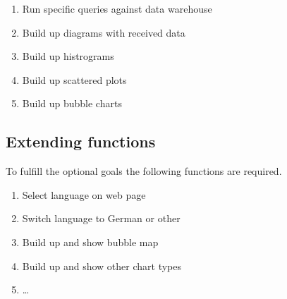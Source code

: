 \begin{enumerate}[resume]
  
  \item Run specific queries against data warehouse
  
  \item Build up diagrams with received data %
  
  \item Build up histrograms
  
  \item Build up scattered plots
  
  \item Build up bubble charts

\end{enumerate}


\subsection{Extending functions}

To fulfill the optional goals the following functions are required.

\begin{enumerate}[resume]
  
  \item Select language on web page
  
  \item Switch language to German or other
  
  \item Build up and show bubble map %
  
  \item Build up and show other chart types
  
  \item \ldots
 
\end{enumerate}
